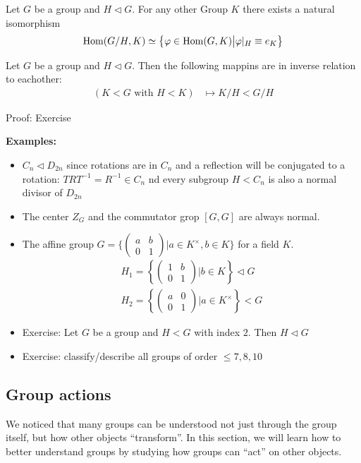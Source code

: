 
\begin{corollary}
	Let $G$ be a group and $H \lhd G$. For any other Group $K$ there exists a natural isomorphism 
	\begin{align*}
		\operatorname{Hom}(G/H,K) \simeq \left\{\varphi \in \operatorname{Hom}(G,K) \big\vert \varphi|_H \equiv e_K\right\}
	\end{align*}
\end{corollary}

\begin{corollary}[]
Let $G$ be a group and $H \lhd G$. Then the following mappins are in inverse relation to eachother:
\begin{align*}
	(K < G \text{ with } H < K) &\mapsto K/H < G/H
\end{align*}
\end{corollary}
Proof: Exercise


\textbf{Examples:}
\begin{itemize}
	\item $C_n \lhd D_{2n}$ since rotations are in $C_n$ and a reflection will be conjugated to a rotation: $TRT^{-1} = R^{-1} \in C_n$ nd every subgroup $H < C_n$ is also a normal divisor of $D_{2n}$
	\item The center $Z_G$ and the commutator grop $[G,G]$ are always normal.
	\item The affine group $G = \{\begin{pmatrix}
	a & b\\
	0 & 1
	\end{pmatrix} \big\vert a \in K^{\times}, b \in K\}$ for a field $K$.
	\begin{align*}
		H_1 = \left\{\begin{pmatrix}
		1 & b\\
		0 & 1
		\end{pmatrix}\big\vert b \in K\right\} \lhd G\\
		H_2 = \left\{\begin{pmatrix}
		a & 0\\
		0 & 1
		\end{pmatrix} \big\vert a \in K^{\times}\right\} < G
	\end{align*}
\item Exercise: Let $G$ be a group and $H < G$ with index $2$. Then $H \lhd G$
\item Exercise: classify/describe all groups of order $\leq 7,8,10$
\end{itemize}


\subsection{Group actions}
We noticed that many groups can be understood not just through the group itself, but how other objects ``transform''. In this section, we will learn how to better understand groups by studying how groups can ``act'' on other objects.

